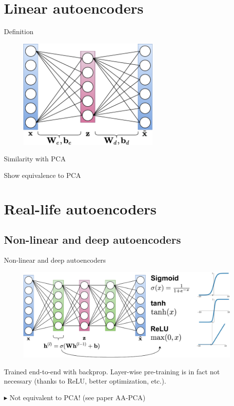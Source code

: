 \documentclass{beamer}
\begin{document}
  \section{Linear autoencoders}

  \begin{frame}{Definition}

    \begin{figure}
      \includegraphics[width=7cm]{rc/linear-autoencoder}
    \end{figure}
    
  \end{frame}

  \begin{frame}{Similarity with PCA}

    Show equivalence to PCA

    \cite{Plaut2018}
    
  \end{frame}

  \section{Real-life autoencoders}

  \subsection{Non-linear and deep autoencoders}

  \begin{frame}{Non-linear and deep autoencoders}

    \begin{figure}
      \includegraphics[width=\textwidth]{rc/deep-autoencoder}
    \end{figure}

    Trained end-to-end with backprop. Layer-wise pre-training \cite{Hinton2006} is in fact not necessary \small{(thanks to ReLU, better optimization, etc.)}.

    $\blacktriangleright$ Not equivalent to PCA! (see paper AA-PCA)

  \end{frame}
\end{document}
